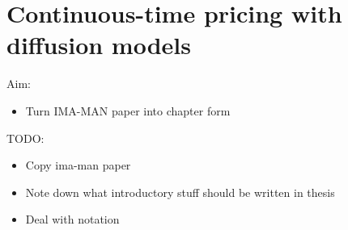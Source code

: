 \documentclass[main.tex]{subfiles}
\begin{document}
\chapter{Continuous-time pricing with diffusion models}


Aim:
\begin{itemize}
\item Turn IMA-MAN paper into chapter form
\end{itemize}

TODO:
\begin{itemize}
\item Copy ima-man paper
\item Note down what introductory stuff should be written in thesis
\item Deal with notation
\end{itemize}

\biblio{} %
\end{document}
